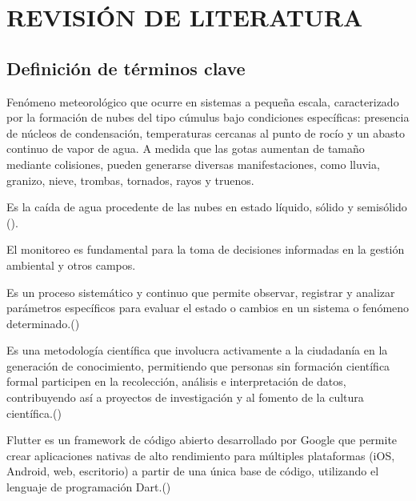 \chapter{REVISIÓN DE LITERATURA}

\section{Definición de términos clave}
\begin{definition}[Precipitación]
 Fenómeno meteorológico que ocurre en sistemas a pequeña escala, caracterizado por la formación de nubes del tipo cúmulus bajo condiciones específicas: presencia de núcleos de condensación, temperaturas cercanas al punto de rocío y un abasto continuo de vapor de agua. A medida que las gotas aumentan de tamaño mediante colisiones, pueden generarse diversas manifestaciones, como lluvia, granizo, nieve, trombas, tornados, rayos y truenos.
\end{definition}

\begin{definition}[Lluvia]
    Es la caída de agua procedente de las nubes en estado líquido, sólido y semisólido (\cite{breña2013}).
\end{definition}


El monitoreo es fundamental para la toma de decisiones informadas en la gestión ambiental y otros campos.
\begin{definition}[Monitoreo]
  Es un proceso sistemático y continuo que permite observar, registrar y analizar parámetros específicos para evaluar el estado o cambios en un sistema o fenómeno determinado.(\cite{ciga_monitoreo})
\end{definition}


\begin{definition}
Es una metodología científica que involucra activamente a la ciudadanía en la generación de conocimiento, permitiendo que personas sin formación científica formal participen en la recolección, análisis e interpretación de datos, contribuyendo así a proyectos de investigación y al fomento de la cultura científica.(\cite{csic_ciencia_ciudadana})
\end{definition}


\begin{definition}[Flutter]
Flutter es un framework de código abierto desarrollado por Google que permite crear aplicaciones nativas de alto rendimiento para múltiples plataformas (iOS, Android, web, escritorio) a partir de una única base de código, utilizando el lenguaje de programación Dart.(\cite{flutter_multiplataforma})
\end{definition}

